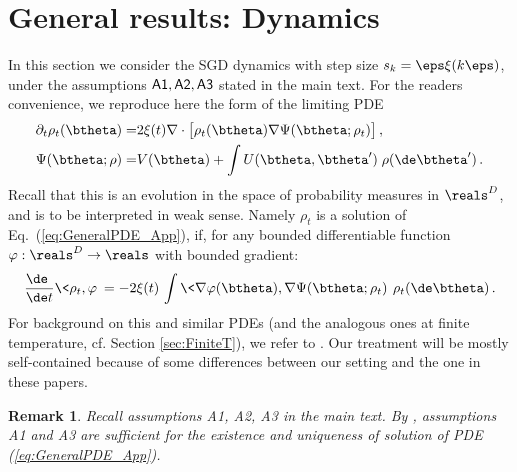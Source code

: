 \documentclass[11pt]{article}
\newtheorem{remark}{Remark}[section]
\begin{document}
\section{General results: Dynamics}

In this section we consider the SGD dynamics with step size $s_k = \eps \xi(k\eps)$, under the assumptions ${\sf A1},  {\sf A2},  {\sf A3}$ 
stated in the main text. For the readers convenience, we reproduce here the form of the limiting PDE 
%
\begin{align}
%
\partial_t\rho_t(\btheta) =& 2 \xi(t) \nabla\cdot \big[\rho_t(\btheta)\nabla\Psi(\btheta;\rho_t)\big]\,, \label{eq:GeneralPDE_App}\\
\Psi(\btheta; \rho) =& V(\btheta) + \int U(\btheta, \btheta')\; \rho(\de \btheta')\,.
%
\end{align}
%
Recall that this is an evolution in the space of probability measures in $\reals^D$, and is to be interpreted in weak sense. Namely $\rho_t$ is a solution of Eq.~(\ref{eq:GeneralPDE_App}), if, for any bounded differentiable function
$\varphi:\reals^D\to\reals$ with bounded gradient:
%
\begin{align}
%
\frac{\de\phantom{t}}{\de t}\<\rho_t,\varphi\> = -2\xi(t)\, \int \<\nabla \varphi(\btheta) ,\nabla \Psi(\btheta;\rho_t)\>\, \rho_t(\de\btheta)\, . \label{eq:WeakSolution}
%
\end{align}
For background on this and similar PDEs  (and the analogous ones at finite temperature, cf. Section \ref{sec:FiniteT}), we refer to
\cite{markowich2000trend,carrillo2003kinetic,carrillo2006contractions,ambrosio2008gradient,carrillo2011global}. Our treatment will be mostly self-contained
because of some differences between our setting and the one in these papers.

%
\begin{remark} \label{rmk:ExistenceUniqueness}
Recall assumptions {\sf A1}, {\sf A2}, {\sf A3} in the main text. 
By \cite[Theorem 1.1]{sznitman1991topics}, assumptions {\sf A1} and {\sf A3} are sufficient  for the existence and uniqueness of solution of PDE (\ref{eq:GeneralPDE_App}). 

\end{remark}
\end{document}
